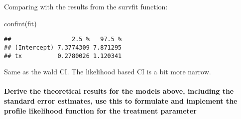 \documentclass[
]{article}
\newenvironment{Shaded}{\begin{snugshade}}{\end{snugshade}}
\newcommand{\FunctionTok}[1]{\textcolor[rgb]{0.00,0.00,0.00}{#1}}
\newcommand{\NormalTok}[1]{#1}
\begin{document}
Comparing with the results from the survfit function:

\begin{Shaded}
\begin{Highlighting}[]
\FunctionTok{confint}\NormalTok{(fit)}
\end{Highlighting}
\end{Shaded}

\begin{verbatim}
##                 2.5 %   97.5 %
## (Intercept) 7.3774309 7.871295
## tx          0.2780026 1.120341
\end{verbatim}

Same as the wald CI. The likelihood based CI is a bit more narrow.

\hypertarget{derive-the-theoretical-results-for-the-models-above-including-the-standard-error-estimates-use-this-to-formulate-and-implement-the-profile-likelihood-function-for-the-treatment-parameter}{%
\paragraph{Derive the theoretical results for the models above,
including the standard error estimates, use this to formulate and
implement the profile likelihood function for the treatment
parameter}\label{derive-the-theoretical-results-for-the-models-above-including-the-standard-error-estimates-use-this-to-formulate-and-implement-the-profile-likelihood-function-for-the-treatment-parameter}}
\end{document}
